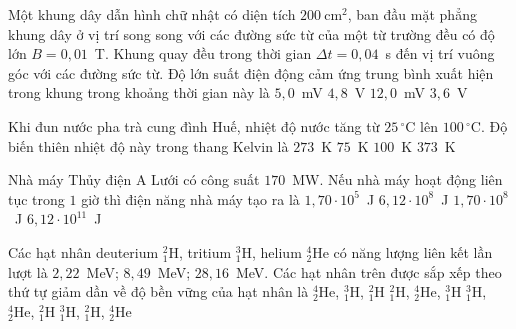 	\begin{ex}%
		Một khung dây dẫn hình chữ nhật có diện tích $200~\text{cm}^2$, ban đầu mặt phẳng khung dây ở vị trí song song với các đường sức từ của một từ trường đều có độ lớn $B=0{,}01$~T. Khung quay đều trong thời gian $\Delta t=0{,}04$~s đến vị trí vuông góc với các đường sức từ. Độ lớn suất điện động cảm ứng trung bình xuất hiện trong khung trong khoảng thời gian này là
		\choice
		{\True $5{,}0$~mV}
		{$4{,}8$~V}
		{$12{,}0$~mV}
		{$3{,}6$~V}
	\end{ex}

	\begin{ex}%
		Khi đun nước pha trà cung đình Huế, nhiệt độ nước tăng từ $25\,^\circ\text{C}$ lên $100\,^\circ\text{C}$. Độ biến thiên nhiệt độ này trong thang Kelvin là
		\choice
		{$273$~K}
		{\True $75$~K}
		{$100$~K}
		{$373$~K}
	\end{ex}

	\begin{ex}%
		Nhà máy Thủy điện A Lưới có công suất $170$~MW. Nếu nhà máy hoạt động liên tục trong $1$ giờ thì điện năng nhà máy tạo ra là
		\choice
		{$1{,}70\cdot 10^5$~J}
		{$6{,}12\cdot 10^8$~J}
		{$1{,}70\cdot 10^8$~J}
		{\True $6{,}12\cdot 10^{11}$~J}
	\end{ex}

	\begin{ex}%
		Các hạt nhân deuterium ${}^2_1\text{H}$, tritium ${}^3_1\text{H}$, helium ${}^4_2\text{He}$ có năng lượng liên kết lần lượt là $2{,}22$~MeV; $8{,}49$~MeV; $28{,}16$~MeV. Các hạt nhân trên được sắp xếp theo thứ tự giảm dần về độ bền vững của hạt nhân là
		\choice
		{\True ${}^4_2\text{He}$, ${}^3_1\text{H}$, ${}^2_1\text{H}$}
		{${}^2_1\text{H}$, ${}^4_2\text{He}$, ${}^3_1\text{H}$}
		{${}^3_1\text{H}$, ${}^4_2\text{He}$, ${}^2_1\text{H}$}
		{${}^3_1\text{H}$, ${}^2_1\text{H}$, ${}^4_2\text{He}$}
	\end{ex}

